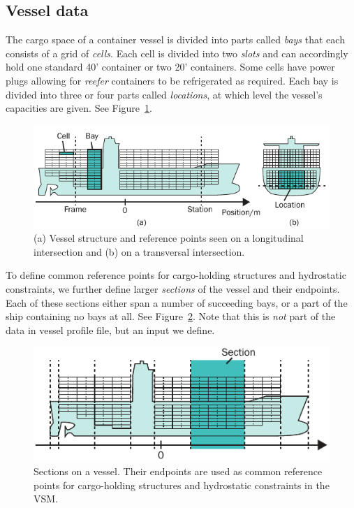 \subsection{Vessel data}
The cargo space of a container vessel is divided into parts called \textit{bays} that each consists of a grid of \emph{cells}. Each cell is divided into two \emph{slots} and can accordingly hold one standard 40' container or two 20' containers. Some cells have power plugs allowing for \emph{reefer} containers to be refrigerated as required. Each bay is divided into three or four parts called \textit{locations}, at which level the vessel's capacities are given. See Figure~\ref{fig:vessel}.

\begin{figure}[hb]
	\centering
		\includegraphics{figures/vessel2.pdf}
	\caption{(a) Vessel structure and reference points seen on a longitudinal intersection and (b) on a transversal intersection.}
	\label{fig:vessel}
\end{figure}

To define common reference points for cargo-holding structures and hydrostatic constraints, we further define larger \emph{sections} of the vessel and their endpoints. Each of these sections either span a number of succeeding bays, or a part of the ship containing no bays at all.
See Figure~\ref{fig:sectionEndPoints}. {Note that this is \emph{not} part of the data in vessel profile file, but an input we define.} 

\begin{figure}[hb]
	\centering
		\includegraphics{figures/sectionEndPoints.pdf}
	\caption{Sections on a vessel. Their endpoints are used as common reference points for cargo-holding structures and hydrostatic constraints in the VSM.}
	\label{fig:sectionEndPoints}
\end{figure}

